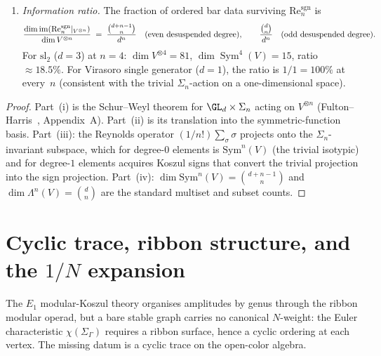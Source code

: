 \begin{proposition}
\begin{enumerate}[label=\textup{(\roman*)}]
 isotypic components lie in $\ker(\mathrm{Re}^{\mathrm{sgn}}_n)$
 and are annihilated.
\item \emph{Information ratio.}
 The fraction of ordered bar data surviving
 $\mathrm{Re}^{\mathrm{sgn}}_n$ is
 \begin{equation}
 \label{eq:information-ratio-bar}
 \frac{\dim \operatorname{im}(\mathrm{Re}^{\mathrm{sgn}}_n|_{V^{\otimes n}})}
 {\dim V^{\otimes n}}
 \;=\;
 \frac{\binom{d + n - 1}{n}}{d^n}
 \quad
 \textup{(even desuspended degree)},
 \qquad
 \frac{\binom{d}{n}}{d^n}
 \quad
 \textup{(odd desuspended degree)}.
 \end{equation}
 For $\mathrm{sl}_2$ \textup{(}$d=3$\textup{)} at
 $n=4$\textup{:} $\dim V^{\otimes 4} = 81$,
 $\dim \operatorname{Sym}^4(V) = 15$, ratio $\approx 18.5\%$.
 For Virasoro single generator \textup{(}$d=1$\textup{)}, the
 ratio is $1/1 = 100\%$ at every~$n$
 \textup{(}consistent with the trivial $\Sigma_n$-action
 on a one-dimensional space\textup{)}.
\end{enumerate}
\end{proposition}

\begin{proof}
Part~(i) is the Schur--Weyl theorem for $\GL_d \times \Sigma_n$
acting on $V^{\otimes n}$ (Fulton--Harris~\cite{FH91},
Appendix~A). Part~(ii) is its translation into the
symmetric-function basis. Part~(iii): the Reynolds operator
$(1/n!)\sum_{\sigma} \sigma$ projects onto the
$\Sigma_n$-invariant subspace, which for degree-$0$ elements is
$\mathrm{Sym}^n(V)$ (the trivial isotypic) and for degree-$1$
elements acquires Koszul signs that convert the trivial projection
into the sign projection.
Part~(iv): $\dim \mathrm{Sym}^n(V) = \binom{d+n-1}{n}$ and
$\dim \Lambda^n(V) = \binom{d}{n}$ are the standard
multiset and subset counts.
\end{proof}

\section{Cyclic trace, ribbon structure, and the
\texorpdfstring{$1/N$}{1/N} expansion}%
\label{sec:e1-ribbon-thooft}%
%

The $E_1$ modular-Koszul theory organises amplitudes by genus through the
ribbon modular operad, but a bare stable graph carries no canonical
$N$-weight: the Euler characteristic $\chi(\Sigma_\Gamma)$ requires
a ribbon surface, hence a cyclic ordering at each vertex. The
missing datum is a cyclic trace on the open-color algebra.

